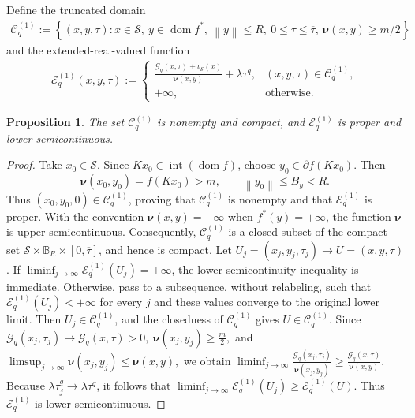\documentclass[9pt]{article}
\numberwithin{equation}{section}
\newtheorem{proposition}[theorem]{Proposition}
\theoremstyle{definition}
\theoremstyle{remark}
\newcommand{\Sset}{\mathcal S}
\newcommand{\norm}[1]{\left\lVert #1\right\rVert}
\newcommand{\Gcal}{\mathcal G}
\newcommand{\Ecal}{\mathcal E}
\newcommand{\Ccal}{\mathcal C}
\newcommand{\clB}{\overline{\mathbb B}}
\newcommand{\nuf}{\boldsymbol\nu}
\DeclareMathOperator{\dom}{dom}
\begin{document}
Define the truncated domain
\begin{eqnarray}\label{eq:C-definition}
 \Ccal_q^{(1)}:=\left\{(x,y,\tau):
 x\in\Sset,\ y\in\dom f^*,\ \norm y\leq R,\ 0\leq\tau\leq\overline\tau,
 \ \nuf(x,y)\geq m/2\right\}
\end{eqnarray}
and the extended-real-valued function
\begin{eqnarray}\label{eq:E-definition}
\Ecal_q^{(1)}(x,y,\tau):=
 \begin{cases}
 \displaystyle\frac{\Gcal_q(x,\tau)+\iota_{\mathcal S}(x)}{\nuf(x,y)}+\lambda\tau^q,
       &(x,y,\tau)\in\Ccal_q^{(1)},\\[1ex]
 +\infty,&\text{otherwise}.
 \end{cases}
\end{eqnarray}


\begin{proposition}
\label{prop:E-subgradient}
The set $\Ccal_q^{(1)}$ is nonempty and compact, and
$\Ecal_q^{(1)}$ is proper and lower semicontinuous.
\end{proposition}
\begin{proof}
Take $x_0\in\Sset$. Since
$Kx_0\in\operatorname{int}(\dom f)$, choose
$y_0\in\partial f(Kx_0)$. Then
\[
 \nuf(x_0,y_0)=f(Kx_0)>m,
 \qquad
 \norm{y_0}\leq B_y<R.
\]
Thus $(x_0,y_0,0)\in\Ccal_q^{(1)}$, proving that
$\Ccal_q^{(1)}$ is nonempty and that $\Ecal_q^{(1)}$ is proper.
With the convention $\nuf(x,y)=-\infty$ when $f^*(y)=+\infty$,
the function $\nuf$ is upper semicontinuous. Consequently,
$\Ccal_q^{(1)}$ is a closed subset of the compact set
$\Sset\times\clB_R\times[0,\overline\tau]$, and hence is compact.
Let $U_j=(x_j,y_j,\tau_j)\to U=(x,y,\tau)$. If
$\liminf_{j\to\infty}\Ecal_q^{(1)}(U_j)=+\infty$,
the lower-semicontinuity inequality is immediate.
Otherwise, pass to a subsequence, without relabeling, such that
$\Ecal_q^{(1)}(U_j)<+\infty$ for every $j$ and these values
converge to the original lower limit.
Then $U_j\in\Ccal_q^{(1)}$, and the closedness of
$\Ccal_q^{(1)}$ gives $U\in\Ccal_q^{(1)}$.
Since
$
 \Gcal_q(x_j,\tau_j)\to\Gcal_q(x,\tau)>0,
 \;
 \nuf(x_j,y_j)\geq\frac m2,
$
and
$
 \limsup_{j\to\infty}\nuf(x_j,y_j)\leq\nuf(x,y),
$
we obtain
$
 \liminf_{j\to\infty}
 \frac{\Gcal_q(x_j,\tau_j)}{\nuf(x_j,y_j)}
 \geq
 \frac{\Gcal_q(x,\tau)}{\nuf(x,y)}.
$
Because $\lambda\tau_j^q\to\lambda\tau^q$, it follows that
$
 \liminf_{j\to\infty}\Ecal_q^{(1)}(U_j)
 \geq\Ecal_q^{(1)}(U).
$
Thus $\Ecal_q^{(1)}$ is lower semicontinuous.
\end{proof}
\end{document}
